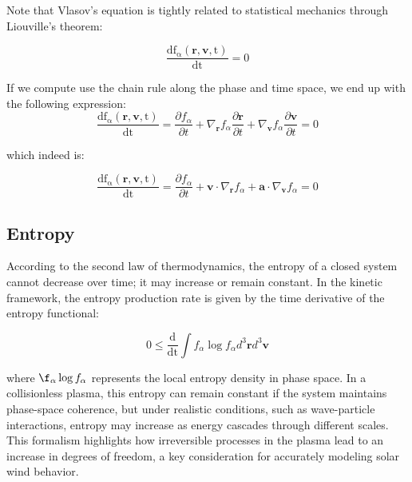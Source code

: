 \documentclass[12pt]{article}
\begin{document}
Note that Vlasov's equation is tightly related to statistical mechanics through Liouville's theorem:

\begin{equation}
    \frac{\mathrm{df_\alpha(\mathbf{r}, \mathbf{v}, t)}}{\mathrm{dt}} = 0
\end{equation}

If we compute use the chain rule along the phase and time space, we end up with the following expression:
\begin{equation}
    \frac{\mathrm{df_\alpha(\mathbf{r}, \mathbf{v}, t)}}{\mathrm{dt}} = \frac{\partial f_\alpha}{\partial t} + \nabla_{\mathbf{r}} f_\alpha \frac{\partial \mathbf{r}}{\partial t} + \nabla_{\mathbf{v}} f_\alpha \frac{\partial \mathbf{v}}{\partial t} = 0
\end{equation}

which indeed is:

\begin{equation}
    \frac{\mathrm{df_\alpha(\mathbf{r}, \mathbf{v}, t)}}{\mathrm{dt}} = \frac{\partial f_\alpha}{\partial t} + \mathbf{v} \cdot \nabla_{\mathbf{r}} f_\alpha + \mathbf{a} \cdot \nabla_{\mathbf{v}} f_\alpha = 0
\end{equation}


\subsection{Entropy}

According to the second law of thermodynamics, the entropy of a closed system cannot decrease over time; it may increase or remain constant. In the kinetic framework, the entropy production rate is given by the time derivative of the entropy functional:

\begin{equation}
    0 \leq \frac{\mathrm{d}}{\mathrm{dt}} \int f_\alpha \log f_\alpha d^3\mathbf{r} d^3\mathbf{v}
\end{equation}

where $\f_\alpha \log f_\alpha$ represents the local entropy density in phase space. In a collisionless plasma, this entropy can remain constant if the system maintains phase-space coherence, but under realistic conditions, such as wave-particle interactions, entropy may increase as energy cascades through different scales. This formalism highlights how irreversible processes in the plasma lead to an increase in degrees of freedom, a key consideration for accurately modeling solar wind behavior.
\end{document}
